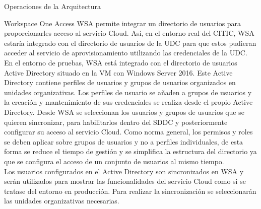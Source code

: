 \begin{subsection}{Operaciones de la Arquitectura}


    \begin{subsubsection}{Workspace One Access}
        \label{subsubsec:WSA}
        WSA permite integrar un directorio de usuarios para proporcionarles acceso al servicio Cloud. Así, en el entorno real del CITIC, WSA estaría integrado con el directorio de usuarios de la UDC para que estos pudieran acceder al servicio de aprovisionamiento utilizando las credenciales de la UDC.\\
        En el entorno de pruebas, WSA está integrado con el directorio de usuarios Active Directory situado en la VM con Windows Server 2016. Este Active Directory contiene perfiles de usuarios y grupos de usuarios organizados en unidades organizativas. Los perfiles de usuario se añaden a grupos de usuarios y la creación y mantenimiento de sus credenciales se realiza desde el propio Active Directory. Desde WSA se seleccionan los usuarios y grupos de usuarios que se quieren sincronizar, para habilitarlos dentro del SDDC y posteriormente configurar su acceso al servicio Cloud. Como norma general, los permisos y roles se deben aplicar sobre grupos de usuarios y no a perfiles individuales, de esta forma se reduce el tiempo de gestión y se simplifica la estructura del directorio ya que se configura el acceso de un conjunto de usuarios al mismo tiempo.\\
        Los usuarios configurados en el Active Directory son sincronizados en WSA y serán utilizados para mostrar las funcionalidades del servicio Cloud como si se tratase del entorno en producción. Para realizar la sincronización se seleccionarán las unidades organizativas necesarias.
        

\end{subsubsection}
\end{subsection}
